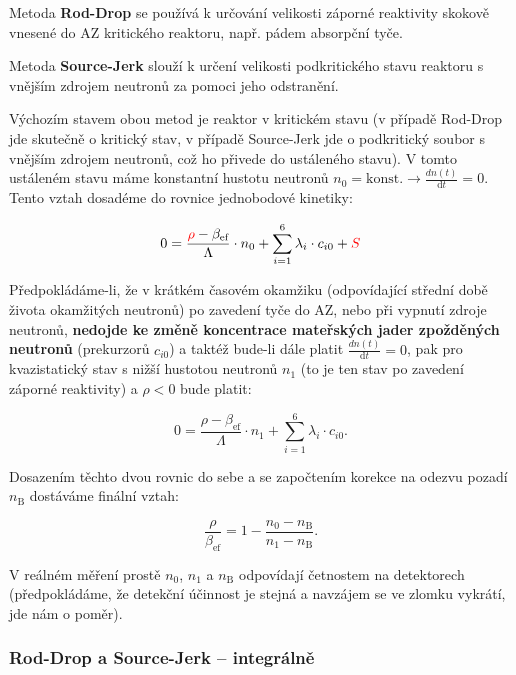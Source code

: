 Metoda \textbf{Rod-Drop} se používá k určování velikosti záporné reaktivity skokově vnesené do AZ kritického reaktoru, např. pádem absorpční tyče. 

Metoda \textbf{Source-Jerk} slouží k určení velikosti podkritického stavu reaktoru s vnějším zdrojem neutronů za pomoci jeho odstranění.

Výchozím stavem obou metod je reaktor v kritickém stavu (v případě Rod-Drop jde skutečně o kritický stav, v případě Source-Jerk jde o podkritický soubor s vnějším zdrojem neutronů, což ho přivede do ustáleného stavu). V tomto ustáleném stavu máme konstantní hustotu neutronů $n_0 = \text{konst.} \rightarrow \frac{dn(t)}{\text{d}t} = 0$. Tento vztah dosadéme do rovnice jednobodové kinetiky:

\begin{equation*}
0 = \frac{\textcolor{red}{\rho}-\beta_{\text{ef}}}{\Lambda} \cdot n_0 + \sum_{i=1}^6 \lambda_i \cdot c_{i0} +\textcolor{red}{S}
\end{equation*}

Předpokládáme-li, že v krátkém časovém okamžiku (odpovídající střední době života okamžitých neutronů) po zavedení tyče do AZ, nebo při vypnutí zdroje neutronů, \textbf{nedojde ke změně koncentrace mateřských jader zpožděných neutronů} (prekurzorů $c_{i0}$) a taktéž bude-li dále platit $\frac{dn(t)}{\text{d}t} = 0$, pak pro kvazistatický stav s nižší hustotou neutronů $n_1$ (to je ten stav po zavedení záporné reaktivity) a $\rho < 0$ bude platit:

\begin{equation*}
0 = \frac{\rho-\beta_{\text{ef}}}{\Lambda} \cdot n_1 + \sum_{i=1}^6 \lambda_i \cdot c_{i0}.
\end{equation*}

Dosazením těchto dvou rovnic do sebe a se započtením korekce na odezvu pozadí $n_\text{B}$ dostáváme finální vztah:

\begin{equation}
    \boxed{ \dfrac{\rho}{\beta_\text{ef}}=1-\dfrac{n_0 - n_\text{B}}{n_1 -n_\text{B}}.}
\end{equation}

V reálném měření prostě $n_0$, $n_1$ a $n_\text{B}$ odpovídají četnostem na detektorech (předpokládáme, že detekční účinnost je stejná a navzájem se ve zlomku vykrátí, jde nám o poměr).

\subsubsection{Rod-Drop a Source-Jerk -- integrálně}

